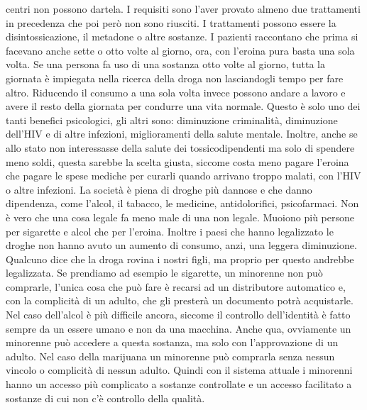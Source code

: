 \documentclass[12pt]{book} %
\begin{document}
\begin{mdframed}[linewidth=1pt]
centri non possono dartela. I requisiti sono l'aver provato almeno due trattamenti in precedenza
che poi però non sono riusciti. I trattamenti possono essere la disintossicazione, il metadone o altre sostanze. I
pazienti raccontano che prima si facevano anche sette o otto volte al giorno, ora, con l'eroina
pura basta una sola volta. Se una persona fa uso di una sostanza otto volte al giorno, tutta la giornata è impiegata
nella ricerca della droga non lasciandogli tempo per fare altro. Riducendo il consumo a una sola volta invece possono
andare a lavoro e avere il resto della giornata per condurre una vita normale. Questo è solo uno dei tanti benefici
psicologici, gli altri sono: diminuzione criminalità, diminuzione dell'HIV e di altre infezioni,
miglioramenti della salute mentale. Inoltre, anche se allo stato non interessasse della salute dei tossicodipendenti ma
solo di spendere meno soldi, questa sarebbe la scelta giusta, siccome costa meno pagare l'eroina
che pagare le spese mediche per curarli quando arrivano troppo malati, con l'HIV o altre
infezioni. La società è piena di droghe più dannose e che danno dipendenza, come l'alcol, il
tabacco, le medicine, antidolorifici, psicofarmaci. Non è vero che una cosa legale fa meno male di una non legale.
Muoiono più persone per sigarette e alcol che per l'eroina. Inoltre i paesi che hanno legalizzato
le droghe non hanno avuto un aumento di consumo, anzi, una leggera
diminuzione. Qualcuno dice che
la droga rovina i nostri figli, ma proprio per questo andrebbe legalizzata. Se prendiamo ad esempio le sigarette, un
minorenne non può comprarle, l'unica cosa che può fare è recarsi ad un distributore automatico e,
con la complicità di un adulto, che gli presterà un documento potrà acquistarle. Nel caso
dell'alcol è più difficile ancora, siccome il controllo dell'identità è fatto
sempre da un essere umano e non da una macchina. Anche qua, ovviamente un minorenne può accedere a questa sostanza, ma
solo con l'approvazione di un adulto. Nel caso della marijuana un minorenne può comprarla senza
nessun vincolo o complicità di nessun adulto. Quindi con il sistema attuale i minorenni hanno un accesso più complicato
a sostanze controllate e un accesso facilitato a sostanze di cui non c'è controllo della qualità.
\end{mdframed}
\end{document}
